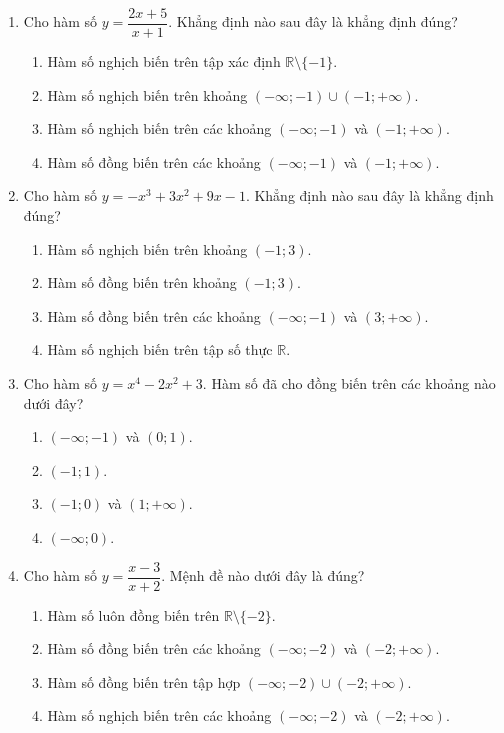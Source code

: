 \documentclass[12pt]{article}
\begin{document}
\begin{enumerate}[label=\textbf{Câu \arabic*.}]
		\item Cho hàm số $y = \dfrac{2x + 5}{x + 1}$. Khẳng định nào sau đây là khẳng định đúng?
		\begin{enumerate}[label=\textbf{\Alph*.}]
			\item Hàm số nghịch biến trên tập xác định $\mathbb{R} \setminus \{-1\}$.
			\item Hàm số nghịch biến trên khoảng $(-\infty; -1) \cup (-1; +\infty)$.
			\item Hàm số nghịch biến trên các khoảng $(-\infty; -1)$ và $(-1; +\infty)$.
			\item Hàm số đồng biến trên các khoảng $(-\infty; -1)$ và $(-1; +\infty)$.
		\end{enumerate}
		
		\item Cho hàm số $y = -x^3 + 3x^2 + 9x - 1$. Khẳng định nào sau đây là khẳng định đúng?
		\begin{enumerate}[label=\textbf{\Alph*.}]
			\item Hàm số nghịch biến trên khoảng $(-1; 3)$.
			\item Hàm số đồng biến trên khoảng $(-1; 3)$.
			\item Hàm số đồng biến trên các khoảng $(-\infty; -1)$ và $(3; +\infty)$.
			\item Hàm số nghịch biến trên tập số thực $\mathbb{R}$.
		\end{enumerate}
		
		\item Cho hàm số $y = x^4 - 2x^2 + 3$. Hàm số đã cho đồng biến trên các khoảng nào dưới đây?
		\begin{enumerate}[label=\textbf{\Alph*.}]
			\item $(-\infty; -1)$ và $(0; 1)$.
			\item $(-1; 1)$.
			\item $(-1; 0)$ và $(1; +\infty)$.
			\item $(-\infty; 0)$.
		\end{enumerate}
		
		\item Cho hàm số $y = \dfrac{x - 3}{x + 2}$. Mệnh đề nào dưới đây là đúng?
		\begin{enumerate}[label=\textbf{\Alph*.}]
			\item Hàm số luôn đồng biến trên $\mathbb{R} \setminus \{-2\}$.
			\item Hàm số đồng biến trên các khoảng $(-\infty; -2)$ và $(-2; +\infty)$.
			\item Hàm số đồng biến trên tập hợp $(-\infty; -2) \cup (-2; +\infty)$.
			\item Hàm số nghịch biến trên các khoảng $(-\infty; -2)$ và $(-2; +\infty)$.
		\end{enumerate}
		

\end{enumerate}
\end{document}
